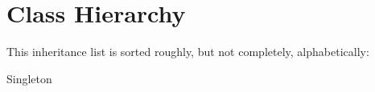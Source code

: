 \section{Class Hierarchy}
This inheritance list is sorted roughly, but not completely, alphabetically\+:\begin{DoxyCompactList}
\item Singleton\begin{DoxyCompactList}
\item {}
\end{DoxyCompactList}
\end{DoxyCompactList}
